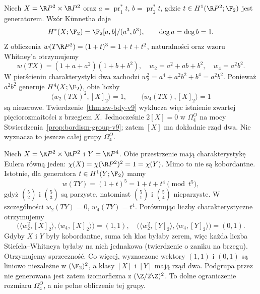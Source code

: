 \begin{przyklad}
\label{prz:bordism-rp2-product}
Niech $X=\R P^2\times\R P^2$ oraz
$a=\operatorname{pr}_1^*t$, $b=\operatorname{pr}_2^*t$, gdzie
$t\in H^1(\R P^2;\F_2)$ jest generatorem. Wzór Künnetha daje
\[
 H^*(X;\F_2)=\F_2[a,b]/(a^3,b^3),\qquad
 \deg a=\deg b=1.
\]
Z obliczenia $w(T\R P^2)=(1+t)^3=1+t+t^2$, naturalności
oraz wzoru Whitney'a otrzymujemy
\[
 w(TX)=(1+a+a^2)(1+b+b^2),\quad
 w_2=a^2+ab+b^2,\quad w_4=a^2b^2.
\]
W pierścieniu charakterystyki dwa zachodzi
$w_2^2=a^4+a^2b^2+b^4=a^2b^2$.
Ponieważ $a^2b^2$ generuje $H^4(X;\F_2)$, obie liczby
\[
 \langle w_2(TX)^2,[X]_2\rangle=1,\qquad
 \langle w_4(TX),[X]_2\rangle=1
\]
są niezerowe. Twierdzenie~\ref{thm:sw-bdy-v9} wyklucza więc
istnienie zwartej pięciorozmaitości z brzegiem $X$.
Jednocześnie $2[X]=0$ w $\Omega_4^O$ na mocy
Stwierdzenia~\ref{prop:bordism-group-v9}; zatem $[X]$ ma dokładnie
rząd dwa. Nie wyznacza to jeszcze całej grupy $\Omega_4^O$.
\end{przyklad}

\begin{przyklad}
\label{prz:bordism-rp4-versus-rp2-square}
Niech $X=\R P^2\times\R P^2$ i $Y=\R P^4$.
Obie przestrzenie mają charakterystykę Eulera równą jeden:
$\chi(X)=\chi(\R P^2)^2=1=\chi(Y)$.
Mimo to nie są kobordantne. Istotnie, dla generatora
$t\in H^1(Y;\F_2)$ mamy
\[
 w(TY)=(1+t)^5=1+t+t^4\pmod {t^5},
\]
gdyż $\binom52$ i $\binom53$ są parzyste, natomiast
$\binom51$ i $\binom54$ nieparzyste. W szczególności
$w_2(TY)=0$, $w_4(TY)=t^4$. Porównując liczby
charakterystyczne otrzymujemy
\[
 \bigl(\langle w_2^2,[X]_2\rangle,\langle w_4,[X]_2\rangle\bigr)
  =(1,1),\quad
 \bigl(\langle w_2^2,[Y]_2\rangle,\langle w_4,[Y]_2\rangle\bigr)
  =(0,1).
\]
Gdyby $X$ i $Y$ były kobordantne, suma ich klas byłaby
zerem, więc każda liczba Stiefela--Whitneya byłaby na nich
jednakowa (twierdzenie o zaniku na brzegu). Otrzymujemy
sprzeczność. Co więcej, wyznaczone wektory $(1,1)$ i $(0,1)$
są liniowo niezależne w $(\F_2)^2$, a klasy $[X]$ i $[Y]$
mają rząd dwa. Podgrupa przez nie generowana jest zatem
izomorficzna z $(\Z/2\Z)^2$. To dolne ograniczenie rozmiaru
$\Omega_4^O$, a nie pełne obliczenie tej grupy.
\end{przyklad}

